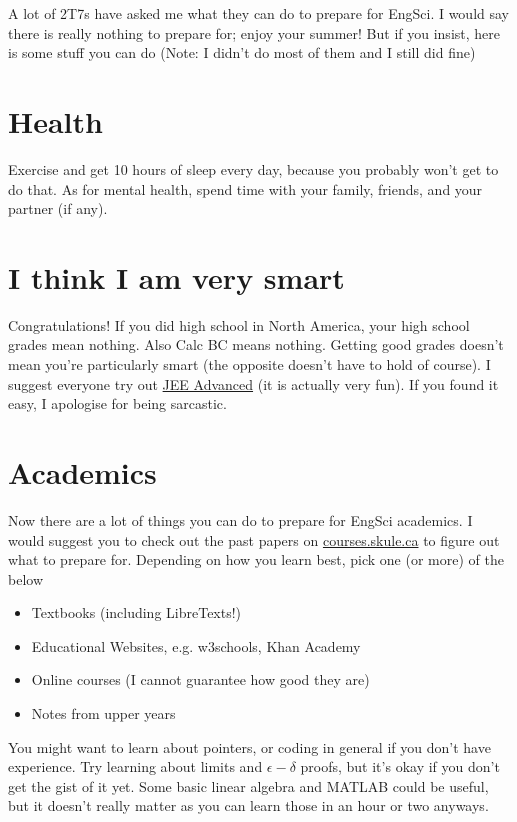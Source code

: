 A lot of 2T7s have asked me what they can do to prepare for EngSci. I would say there is really nothing to prepare for; enjoy your summer! But if you insist, here is some stuff you can do (Note: I didn't do most of them and I still did fine)

\section{Health}

Exercise and get 10 hours of sleep every day, because you probably won't get to do that. As for mental health, spend time with your family, friends, and your partner (if any).

\section{I think I am very smart}

Congratulations! If you did high school in North America, your high school grades mean nothing. Also Calc BC means nothing. Getting good grades doesn't mean you're particularly smart (the opposite doesn't have to hold of course). I suggest everyone try out \href{https://byjus.com/jee/jee-advanced-2022-question-paper/https://byjus.com/jee/jee-advanced-2022-question-paper/}{JEE Advanced} (it is actually very fun). If you found it easy, I apologise for being sarcastic.

\section{Academics}

Now there are a lot of things you can do to prepare for EngSci academics. I would suggest you to check out the past papers on \url{courses.skule.ca} to figure out what to prepare for. Depending on how you learn best, pick one (or more) of the below

\begin{itemize}
    \item Textbooks (including LibreTexts!)
    \item Educational Websites, e.g. w3schools, Khan Academy
    \item Online courses (I cannot guarantee how good they are)
    \item Notes from upper years
\end{itemize}

You might want to learn about pointers, or coding in general if you don't have experience. Try learning about limits and $\epsilon-\delta$ proofs, but it's okay if you don't get the gist of it yet. Some basic linear algebra and MATLAB could be useful, but it doesn't really matter as you can learn those in an hour or two anyways.

